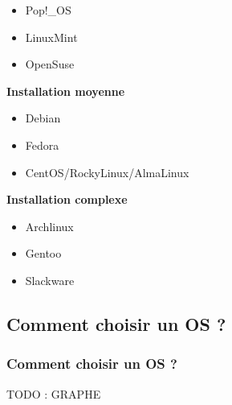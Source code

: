 \documentclass{beamer}
\begin{document}
\begin{frame}
{\begin{itemize}
                    \item Pop!\_OS
                    \item LinuxMint
                    \item OpenSuse
                \end{itemize}
                \textbf{Installation moyenne}
                \begin{itemize}
                    \item Debian
                    \item Fedora
                    \item CentOS/RockyLinux/AlmaLinux
                \end{itemize}
                \textbf{Installation complexe}
                \begin{itemize}
                    \item Archlinux
                    \item Gentoo
                    \item Slackware
                \end{itemize}
            }
        \end{frame}
        \subsection{Comment choisir un OS ?}
        \begin{frame}
            \frametitle{Comment choisir un OS ?}
            TODO : GRAPHE
        \end{frame}
\end{document}
